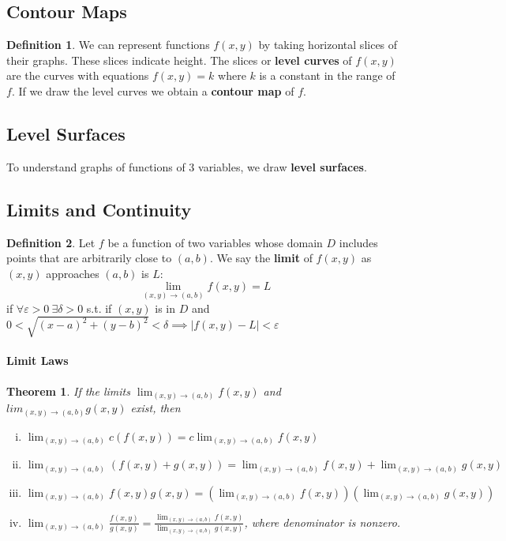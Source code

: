 \documentclass[12 pt]{article}
\newtheorem{thm}{Theorem}
\theoremstyle{definition}
\newtheorem{defn}{Definition}
\begin{document}
\subsection{Contour Maps}
\begin{defn}
	We can represent functions $f(x,y)$ by taking horizontal slices of their graphs. These slices indicate height. The slices or \textbf{level curves} of $f(x,y)$ are the curves with equations $f(x,y)=k$ where $k$ is a constant in the range of $f$. If we draw the level curves we obtain a \textbf{contour map} of $f$.
\end{defn}
\subsection{Level Surfaces} To understand graphs of functions of $3$ variables, we draw \textbf{level surfaces}.
\subsection{Limits and Continuity}
\begin{defn}
	Let $f$ be a function of two variables whose domain $D$ includes points that are arbitrarily close to $(a,b)$. We say the \textbf{limit} of $f(x,y)$ as $(x,y)$ approaches $(a,b)$ is $L$: 
	$$\lim_{(x,y)\to (a,b)}f(x,y)=L$$
	if $\forall \varepsilon>0 \ \exists \delta>0$ s.t. if $(x,y)$ is in $D$ and $0<\sqrt{(x-a)^2+(y-b)^2}<\delta \implies |f(x,y)-L|<\varepsilon$
\end{defn}
\paragraph{Limit Laws}
\begin{thm}
	If the limits $\lim_{(x,y)\to(a,b)}f(x,y)$ and $lim_{(x,y)\to(a,b)}g(x,y)$ exist, then
	\begin{enumerate}[i)]
		\item $\lim_{(x,y)\to (a,b)}c (f(x,y))=c \lim_{(x,y)\to (a,b)}f(x,y)$
		\item $\lim_{(x,y)\to (a,b)}(f(x,y)+g(x,y))=\lim_{(x,y)\to (a,b)}f(x,y)+\lim_{(x,y)\to(a,b)}g(x,y)$
		\item $\lim_{(x,y)\to (a,b)}f(x,y)g(x,y)=(\lim_{(x,y)\to(a,b)}f(x,y))(\lim_{(x,y)\to(a,b)}g(x,y))$
		\item $\lim_{(x,y)\to(a,b)} \frac{f(x,y)}{g(x,y)}=\frac{\lim_{(x,y)\to(a,b)}f(x,y)}{\lim_{(x,y)\to(a,b)}g(x,y)}$, where denominator is nonzero.
	\end{enumerate}
\end{thm}
\end{document}
